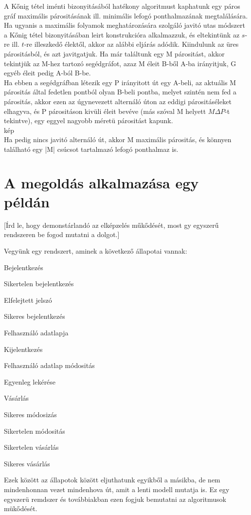 \documentclass[12pt]{article}
\begin{document}
A Kőnig tétel iménti bizonyitásából hatékony algoritmust kaphatunk egy páros gráf maximális párositásának ill. minimális lefogó ponthalmazának megtalálására. Ha ugyanis a maximális folyamok meghatározására szolgáló javitó utas módszert a Kőnig tétel bizonyitásában leirt konstrukcióra alkalmazzuk, és eltekintünk az $s$-re ill. $t$-re illeszkedő élektől, akkor az alábbi eljárás adódik. Kiindulunk az üres párositásból, és azt javitgatjuk. Ha már találtunk egy M párositást, akkor tekintjük az M-hez tartozó segédgráfot, azaz M éleit B-ből A-ba irányitjuk, G egyéb éleit pedig A-ból B-be.\\
Ha ebben a segédgráfban létezik egy P irányitott út egy A-beli, az aktuális M párositás által fedetlen pontból olyan B-beli pontba, melyet szintén nem fed a párositás, akkor ezen az úgynevezett alternáló úton az eddigi párositáséleket elhagyva, és P párositáson kivüli éleit bevéve (más szóval M helyett $M \Delta P$-t tekintve), egy eggyel nagyobb méretü párositást kapunk.\\
kép\\
Ha pedig nincs javitó alternáló út, akkor M maximális párositás, és könnyen található egy |M| csúcsot tartalmazó lefogó ponthalmaz is.


\section{A megoldás alkalmazása egy példán}
[Írd le, hogy demonstárlandó az elképzelés műkődését, most gy egyszerű rendszeren be fogod mutatni a dolgot.]

Vegyünk egy rendszert, aminek a következő állapotai vannak:
\item Bejelentkezés
\item Sikertelen bejelentkezés
\item Elfelejtett jelszó
\item Sikeres bejelentkezés
\item Felhasználó adatlapja
\item Kijelentkezés
\item Felhasználó adatlap módositás
\item Egyenleg lekérése
\item Vásárlás
\item Sikeres módosizás
\item Sikertelen módositás
\item Sikertelen vásárlás
\item Sikeres vásárlás

Ezek között az állapotok között eljuthatunk egyikből a másikba, de nem mindenhonnan vezet mindenhova út, amit a lenti modell mutatja is.
Ez egy egyszerü remdszer és továbbiakban ezen fogjuk bemutatni az algoritmusok mükődését.
\end{document}
